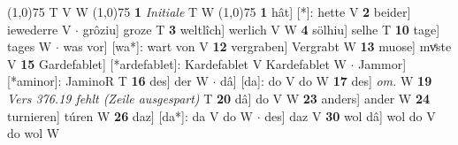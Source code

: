 \documentclass[8pt,a4paper,notitlepage]{article}
\begin{document}
\begin{table}[ht]
\begin{minipage}[t]{0.5\linewidth}
\scriptsize
\line(1,0){75} \newline
T V W \newline
\line(1,0){75} \newline
\textbf{1} \textit{Initiale} T W  \newline
\line(1,0){75} \newline
\textbf{1} hât] [*]: hette V \textbf{2} beider] iewederre V  $\cdot$ grôziu] groze T \textbf{3} weltlîch] werlich V W \textbf{4} sölhiu] selhe T \textbf{10} tage] tages W  $\cdot$ was vor] [wa*]: wart von V \textbf{12} vergraben] Vergrabt W \textbf{13} muose] mvͤste V \textbf{15} Gardefablet] [*ardefablet]: Kardefablet V Kardefablet W  $\cdot$ Jammor] [*aminor]: JaminoR T \textbf{16} des] der W  $\cdot$ dâ] [da]: do V do W \textbf{17} des] \textit{om.} W \textbf{19} \textit{Vers 376.19 fehlt (Zeile ausgespart)} T  \textbf{20} dâ] do V W \textbf{23} anders] ander W \textbf{24} turnieren] túren W \textbf{26} daz] [da*]: da V do W  $\cdot$ des] daz V \textbf{30} wol dâ] wol do V do wol W \newline
\end{minipage}
\end{table}
\end{document}
